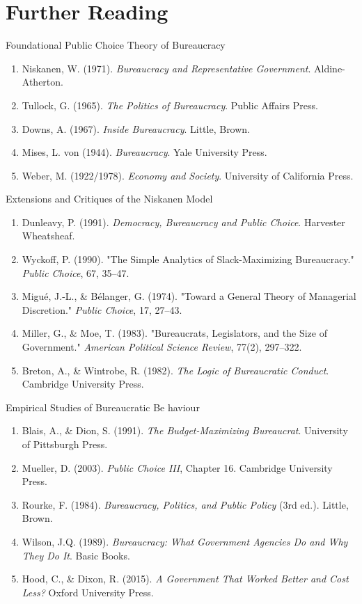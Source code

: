 \documentclass[10pt]{beamer}
\begin{document}
\section*{Further Reading}

\begin{frame}{Foundational Public Choice Theory of Bureaucracy}
\footnotesize
\begin{enumerate}
\item Niskanen, W. (1971). \emph{Bureaucracy and Representative Government}. Aldine-Atherton.
\item Tullock, G. (1965). \emph{The Politics of Bureaucracy}. Public Affairs Press.
\item Downs, A. (1967). \emph{Inside Bureaucracy}. Little, Brown.
\item Mises, L. von (1944). \emph{Bureaucracy}. Yale University Press.
\item Weber, M. (1922/1978). \emph{Economy and Society}. University of California Press.
\end{enumerate}
\end{frame}

\begin{frame}{Extensions and Critiques of the Niskanen Model}
\footnotesize
\begin{enumerate}
\item Dunleavy, P. (1991). \emph{Democracy, Bureaucracy and Public Choice}. Harvester Wheatsheaf.
\item Wyckoff, P. (1990). "The Simple Analytics of Slack-Maximizing Bureaucracy." \emph{Public Choice}, 67, 35–47.
\item Migué, J.-L., \& Bélanger, G. (1974). "Toward a General Theory of Managerial Discretion." \emph{Public Choice}, 17, 27–43.
\item Miller, G., \& Moe, T. (1983). "Bureaucrats, Legislators, and the Size of Government." \emph{American Political Science Review}, 77(2), 297–322.
\item Breton, A., \& Wintrobe, R. (1982). \emph{The Logic of Bureaucratic Conduct}. Cambridge University Press.
\end{enumerate}
\end{frame}

\begin{frame}{Empirical Studies of Bureaucratic Be haviour}
\footnotesize
\begin{enumerate}
\item Blais, A., \& Dion, S. (1991). \emph{The Budget-Maximizing Bureaucrat}. University of Pittsburgh Press.
\item Mueller, D. (2003). \emph{Public Choice III}, Chapter 16. Cambridge University Press.
\item Rourke, F. (1984). \emph{Bureaucracy, Politics, and Public Policy} (3rd ed.). Little, Brown.
\item Wilson, J.Q. (1989). \emph{Bureaucracy: What Government Agencies Do and Why They Do It}. Basic Books.
\item Hood, C., \& Dixon, R. (2015). \emph{A Government That Worked Better and Cost Less?} Oxford University Press.
\end{enumerate}
\end{frame}
\end{document}
